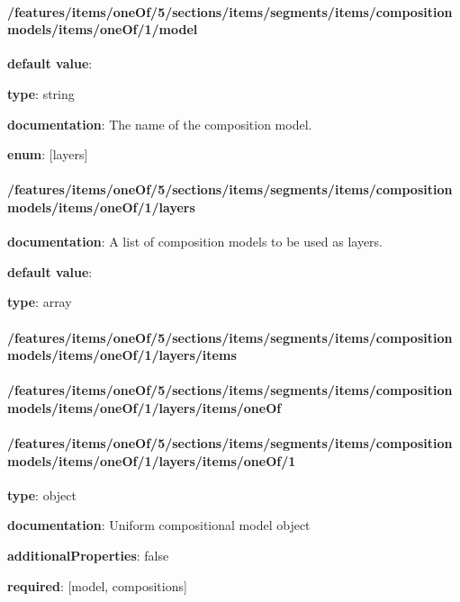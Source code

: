 \paragraph{/features/items/oneOf/5/sections/items/segments/items/composition models/items/oneOf/1/model} \begin{itemized}
\item {\bf default value}: 
\item {\bf type}: string
\item {\bf documentation}: The name of the composition model.
\item {\bf enum}: [layers]\end{itemized}\paragraph{/features/items/oneOf/5/sections/items/segments/items/composition models/items/oneOf/1/layers} \begin{itemized}
\item {\bf documentation}: A list of composition models to be used as layers.
\item {\bf default value}: 
\item {\bf type}: array
\paragraph{/features/items/oneOf/5/sections/items/segments/items/composition models/items/oneOf/1/layers/items} \begin{itemized}
\end{itemized}\end{itemized}\paragraph{/features/items/oneOf/5/sections/items/segments/items/composition models/items/oneOf/1/layers/items/oneOf} \begin{itemized}
\end{itemized}\paragraph{/features/items/oneOf/5/sections/items/segments/items/composition models/items/oneOf/1/layers/items/oneOf/1} \begin{itemized}
\item {\bf type}: object
\item {\bf documentation}: Uniform compositional model object
\item {\bf additionalProperties}: false
\item {\bf required}: [model, compositions]\end{itemized}
